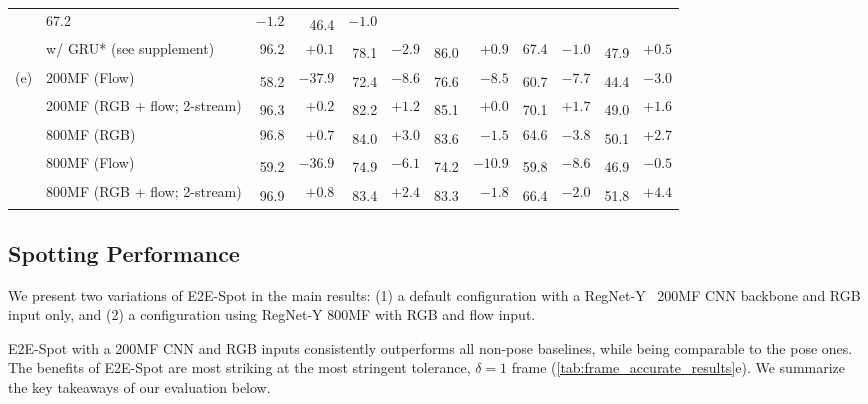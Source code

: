 \documentclass[runningheads]{llncs}
\newcommand{\notation}[1]{\ensuremath{#1}\xspace}
\newcommand{\OURMETHOD}{{E2E-Spot}\xspace}
\newcommand{\Tolerance}{\notation{\delta}}
\newcommand{\nms}{\textsuperscript{\textdagger}}
\begin{document}
\begin{table*}[t]
{\begin{tabularx}{\textwidth}{ll rr rr rr rr rr}
            & 67.2 & $-1.2$
            & \nms 46.4 & $-1.0$ \\
        & \tabindent w/ GRU* (see supplement)
            & 96.2 &  $+0.1$
            & \nms 78.1 & $-2.9$
            & \nms 86.0 & $+0.9$
            & 67.4 & $-1.0$
            & \nms 47.9 & $+0.5$ \\
        \midrule
        (e)
        & 200MF (Flow)
            & \nms 58.2 & $-37.9$
            & \nms 72.4 & $-8.6$
            & \nms 76.6 & $-8.5$
            & \nms 60.7 & $-7.7$
            & \nms 44.4 & $-3.0$ \\
        & 200MF (RGB + flow; 2-stream)
            & \nms 96.3 & $+0.2$
            & \nms 82.2 & $+1.2$
            & \nms 85.1 & $+0.0$
            & \nms 70.1 & $+1.7$
            & \nms 49.0 & $+1.6$ \\
        \cmidrule{2-12}
        & 800MF (RGB)
            & 96.8 &  $+0.7$
            & \nms 84.0 & $+3.0$
            & \nms 83.6 & $-1.5$
            & 64.6 & $-3.8$
            & \nms 50.1 & $+2.7$ \\
        & 800MF (Flow)
            & \nms 59.2 & $-36.9$
            & \nms 74.9 & $-6.1$
            & \nms 74.2 & $-10.9$
            & \nms 59.8 & $-8.6$
            & \nms 46.9 & $-0.5$ \\
        & 800MF (RGB + flow; 2-stream)
            & \nms 96.9 & $+0.8$
            & \nms 83.4 & $+2.4$
            & \nms 83.3 & $-1.8$
            & \nms 66.4 & $-2.0$
            & \nms 51.8 & $+4.4$ \\
        \bottomrule
    \end{tabularx}
    }
\end{table*}
 
\subsection{Spotting Performance}
\label{sec:performance}

We present two variations of \OURMETHOD in the main results: (1) a default configuration with a RegNet-Y~\cite{regnet} 200MF CNN backbone and RGB input only, and (2) a configuration using RegNet-Y 800MF with RGB and flow input.

\OURMETHOD with a 200MF CNN and RGB inputs consistently outperforms all non-pose baselines, while being comparable to the pose ones.
The benefits of \OURMETHOD are most striking at the most stringent
tolerance, $\Tolerance=1$ frame (\autoref{tab:frame_accurate_results}e).
We summarize the key takeaways of our evaluation below.
\end{document}
